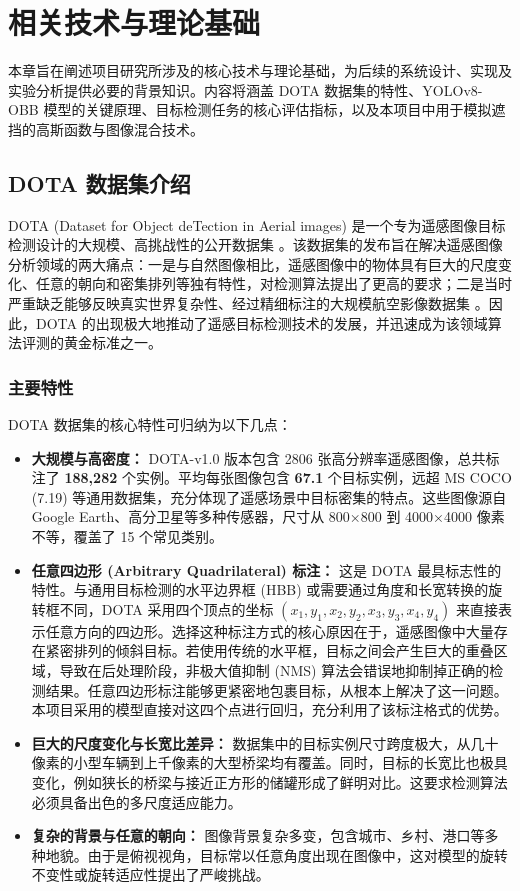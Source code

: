 \documentclass[12pt, a4paper]{report}
\begin{document}
\chapter{相关技术与理论基础}
本章旨在阐述项目研究所涉及的核心技术与理论基础，为后续的系统设计、实现及实验分析提供必要的背景知识。内容将涵盖 DOTA 数据集的特性、YOLOv8-OBB 模型的关键原理、目标检测任务的核心评估指标，以及本项目中用于模拟遮挡的高斯函数与图像混合技术。

\section{DOTA 数据集介绍}
DOTA (Dataset for Object deTection in Aerial images) 是一个专为遥感图像目标检测设计的大规模、高挑战性的公开数据集 \cite{dota}。该数据集的发布旨在解决遥感图像分析领域的两大痛点：一是与自然图像相比，遥感图像中的物体具有巨大的尺度变化、任意的朝向和密集排列等独有特性，对检测算法提出了更高的要求；二是当时严重缺乏能够反映真实世界复杂性、经过精细标注的大规模航空影像数据集 \cite{dota}。因此，DOTA 的出现极大地推动了遥感目标检测技术的发展，并迅速成为该领域算法评测的黄金标准之一。

\subsection{主要特性}
DOTA 数据集的核心特性可归纳为以下几点：
\begin{itemize}
    \item \textbf{大规模与高密度：} DOTA-v1.0 版本包含 2806 张高分辨率遥感图像，总共标注了 \textbf{188,282} 个实例。平均每张图像包含 \textbf{67.1} 个目标实例，远超 MS COCO (7.19) 等通用数据集，充分体现了遥感场景中目标密集的特点。这些图像源自 Google Earth、高分卫星等多种传感器，尺寸从 800×800 到 4000×4000 像素不等，覆盖了 15 个常见类别。
    
    \item \textbf{任意四边形 (Arbitrary Quadrilateral) 标注：} 这是 DOTA 最具标志性的特性。与通用目标检测的水平边界框 (HBB) 或需要通过角度和长宽转换的旋转框不同，DOTA 采用四个顶点的坐标 $(x_1, y_1, x_2, y_2, x_3, y_3, x_4, y_4)$ 来直接表示任意方向的四边形。选择这种标注方式的核心原因在于，遥感图像中大量存在紧密排列的倾斜目标。若使用传统的水平框，目标之间会产生巨大的重叠区域，导致在后处理阶段，非极大值抑制 (NMS) 算法会错误地抑制掉正确的检测结果。任意四边形标注能够更紧密地包裹目标，从根本上解决了这一问题。本项目采用的模型直接对这四个点进行回归，充分利用了该标注格式的优势。
    
    \item \textbf{巨大的尺度变化与长宽比差异：} 数据集中的目标实例尺寸跨度极大，从几十像素的小型车辆到上千像素的大型桥梁均有覆盖。同时，目标的长宽比也极具变化，例如狭长的桥梁与接近正方形的储罐形成了鲜明对比。这要求检测算法必须具备出色的多尺度适应能力。
    
    \item \textbf{复杂的背景与任意的朝向：} 图像背景复杂多变，包含城市、乡村、港口等多种地貌。由于是俯视视角，目标常以任意角度出现在图像中，这对模型的旋转不变性或旋转适应性提出了严峻挑战。
\end{itemize}
\end{document}
